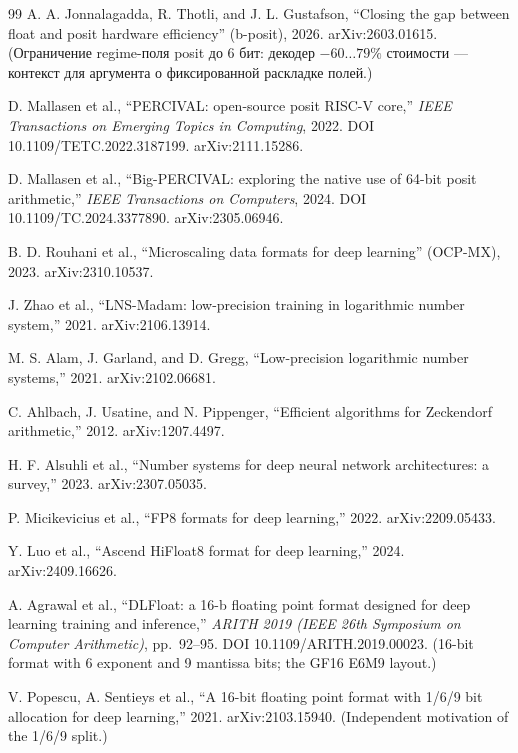 \documentclass[11pt,a4paper]{article}
\theoremstyle{plain}
\begin{document}
\begin{thebibliography}{99}
 A. A. Jonnalagadda, R. Thotli, and
J. L. Gustafson, ``Closing the gap between float and posit hardware
efficiency'' (b-posit), 2026. arXiv:2603.01615. (Ограничение regime-поля
posit до 6 бит: декодер \(-60\dots79\%\) стоимости --- контекст для
аргумента о фиксированной раскладке полей.)

 D. Mallasen et al., ``PERCIVAL: open-source
posit RISC-V core,'' \emph{IEEE Transactions on Emerging Topics in
Computing}, 2022. DOI 10.1109/TETC.2022.3187199. arXiv:2111.15286.

 D. Mallasen et al., ``Big-PERCIVAL:
exploring the native use of 64-bit posit arithmetic,'' \emph{IEEE
Transactions on Computers}, 2024. DOI 10.1109/TC.2024.3377890.
arXiv:2305.06946.

 B. D. Rouhani et al., ``Microscaling data formats
for deep learning'' (OCP-MX), 2023. arXiv:2310.10537.

 J. Zhao et al., ``LNS-Madam: low-precision training
in logarithmic number system,'' 2021. arXiv:2106.13914.

 M. S. Alam, J. Garland, and D. Gregg, ``Low-precision
logarithmic number systems,'' 2021. arXiv:2102.06681.

 C. Ahlbach, J. Usatine, and N. Pippenger, ``Efficient
algorithms for Zeckendorf arithmetic,'' 2012. arXiv:1207.4497.

 H. F. Alsuhli et al., ``Number systems for deep
neural network architectures: a survey,'' 2023. arXiv:2307.05035.

 P. Micikevicius et al., ``FP8 formats for deep
learning,'' 2022. arXiv:2209.05433.

 Y. Luo et al., ``Ascend HiFloat8 format for deep
learning,'' 2024. arXiv:2409.16626.

 A. Agrawal et al., ``DLFloat: a 16-b floating
point format designed for deep learning training and inference,''
\emph{ARITH 2019 (IEEE 26th Symposium on Computer Arithmetic)}, pp.~92--95.
DOI 10.1109/ARITH.2019.00023. (16-bit format with 6 exponent and 9 mantissa
bits; the GF16 E6M9 layout.)

 V. Popescu, A. Sentieys et al., ``A 16-bit floating
point format with 1/6/9 bit allocation for deep learning,'' 2021.
arXiv:2103.15940. (Independent motivation of the 1/6/9 split.)


\end{thebibliography}
\end{document}
